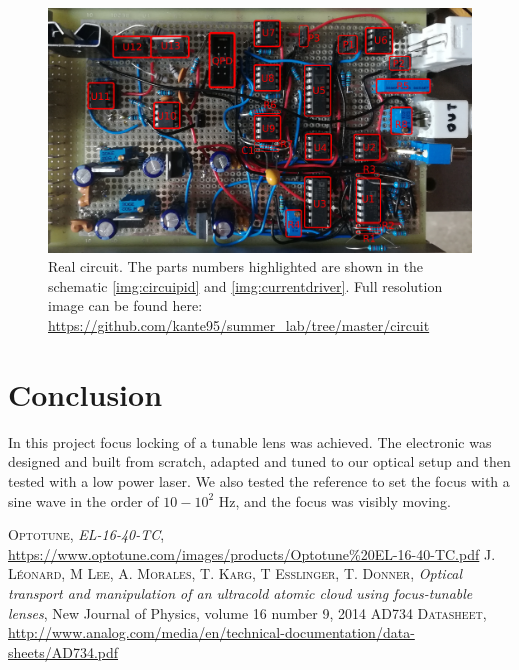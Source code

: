 \documentclass[a4paper,10pt]{article}
\begin{document}
\begin{figure}
\centering
\includegraphics[width = \textwidth]{circuit/layout}
\caption{Real circuit. The parts numbers highlighted are shown in the schematic \ref{img:circuipid} and \ref{img:currentdriver}. Full resolution image can be found here: \url{https://github.com/kante95/summer_lab/tree/master/circuit}} \label{img:layout}
\end{figure}
\newpage
\section{Conclusion}
In this project focus locking of a tunable lens was achieved. The electronic was designed and built from scratch, adapted and tuned to our optical setup and then tested with a low power laser. We also tested the reference to set the focus with a sine wave in the order of $10-10^2$ Hz, and the focus was visibly moving. 



 \begin{thebibliography}{99}
 \textsc{Optotune}, \textit{EL-16-40-TC}, \url{https://www.optotune.com/images/products/Optotune%20EL-16-40-TC.pdf}
%
 \textsc{J. Léonard, M Lee, A. Morales, T. Karg, T Esslinger, T. Donner}, \textit{Optical transport and manipulation of an ultracold atomic cloud using focus-tunable lenses}, New Journal of Physics, volume 16 number 9, 2014
\textsc{AD734 Datasheet}, \url{http://www.analog.com/media/en/technical-documentation/data-sheets/AD734.pdf}
%
%
%
%
%
 \end{thebibliography}
\end{document}
